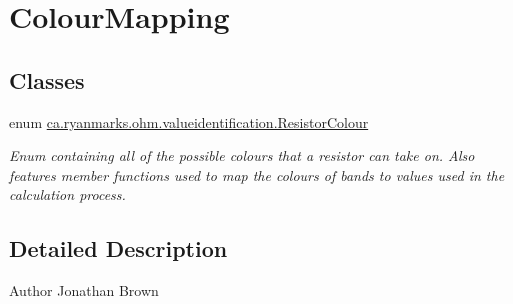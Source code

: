 \hypertarget{group___colour_mapping}{}\section{Colour\+Mapping}
\label{group___colour_mapping}
\subsection*{Classes}
\begin{DoxyCompactItemize}
\item 
enum \hyperlink{enumca_1_1ryanmarks_1_1ohm_1_1valueidentification_1_1_resistor_colour}{ca.\+ryanmarks.\+ohm.\+valueidentification.\+Resistor\+Colour}
\begin{DoxyCompactList}\small\item\em Enum containing all of the possible colours that a resistor can take on. Also features member functions used to map the colours of bands to values used in the calculation process. \end{DoxyCompactList}\end{DoxyCompactItemize}


\subsection{Detailed Description}
\begin{DoxyAuthor}{Author}
Jonathan Brown 
\end{DoxyAuthor}
